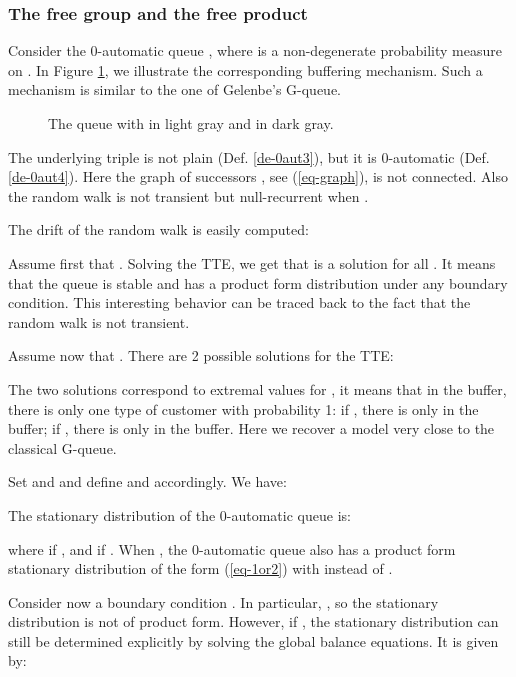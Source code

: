 \documentclass[11pt,a4paper]{article}
\theoremstyle{remark}
\def\eref#1{(\ref{#1})}
\begin{document}
\subsubsection{The free group  and the free product }\label{ssse-fg}

Consider the 0-automatic queue
, where  is a
non-degenerate probability measure on . In
Figure \ref{fi-fg}, we illustrate the corresponding buffering
mechanism. Such a mechanism is similar to the one of Gelenbe's
G-queue. 

\begin{figure}[ht]

\caption{The  queue with  in light gray
  and  in dark gray.}
\label{fi-fg}
\end{figure}

The underlying triple  is not plain
(Def. \ref{de-0aut3}), but it is 0-automatic (Def. \ref{de-0aut4}). 
Here the graph of successors , see
\eref{eq-graph}, is not connected. Also the random walk  is
not transient but null-recurrent when .

The drift of the random walk is easily computed:


Assume first that . Solving the TTE, we get
that  is a solution for all . It means that the queue is stable and has a product form
distribution under any boundary condition. This interesting
behavior can be traced back to the fact that the random walk
 is not transient.

\medskip

Assume now that . There are 2 possible
solutions for the TTE:


The two solutions correspond to extremal values for , it means
that in the buffer, there is only one type of customer with
probability 1: if , there is only  in the buffer;
if , there is only  in the buffer. Here we
recover a model very close to the classical G-queue.

Set  and  and define  and
 accordingly. We have:

The stationary distribution of the 0-automatic queue  is:

where  if , and  if .
When , the 0-automatic queue  also has a product form stationary
distribution of the form \eref{eq-1or2} with  instead of
.

\medskip

Consider now a boundary condition . In particular,
, so the stationary distribution is not of
product form. However, if  , the
stationary distribution  can still be determined explicitly
by solving the global balance equations. It is given by:
\end{document}
